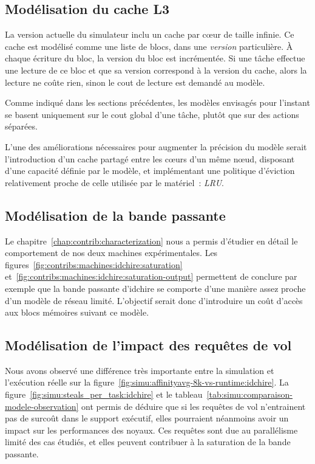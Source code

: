 \subsection{Modélisation du cache L3}

La version actuelle du simulateur inclu un cache par cœur de taille infinie.
Ce cache est modélisé comme une liste de blocs, dans une \emph{version} particulière.
À chaque écriture du bloc, la version du bloc est incrémentée.
Si une tâche effectue une lecture de ce bloc et que sa version correspond à la version du cache, alors la lecture ne coûte rien, sinon le cout de lecture est demandé au modèle.

Comme indiqué dans les sections précédentes, les modèles envisagés pour l'instant se basent uniquement sur le cout global d'une tâche, plutôt que sur des actions séparées.

L'une des améliorations nécessaires pour augmenter la précision du modèle serait l'introduction d'un cache partagé entre les cœurs d'un même nœud, disposant d'une capacité définie par le modèle, et implémentant une politique d'éviction relativement proche de celle utilisée par le matériel~: \emph{LRU}.

\subsection{Modélisation de la bande passante}

Le chapitre~\ref{chap:contrib:characterization} nous a permis d'étudier en détail le comportement de nos deux machines expérimentales.
Les figures~\ref{fig:contribs:machines:idchire:saturation} et~\ref{fig:contribs:machines:idchire:saturation-output} permettent de conclure par exemple que la bande passante d'idchire se comporte d'une manière assez proche d'un modèle de réseau limité.
L'objectif serait donc d'introduire un coût d'accès aux blocs mémoires suivant ce modèle.

\subsection{Modélisation de l'impact des requêtes de vol}

Nous avons observé une différence très importante entre la simulation et l'exécution réelle sur la figure~\ref{fig:simu:affinityavg-8k-vs-runtime:idchire}.
La figure~\ref{fig:simu:steals_per_task:idchire} et le tableau~\ref{tab:simu:comparaison-modele-observation} ont permis de déduire que si les requêtes de vol n'entrainent pas de surcoût dans le support exécutif, elles pourraient néanmoins avoir un impact sur les performances des noyaux.
Ces requêtes sont due au parallélisme limité des cas étudiés, et elles peuvent contribuer à la saturation de la bande passante.


